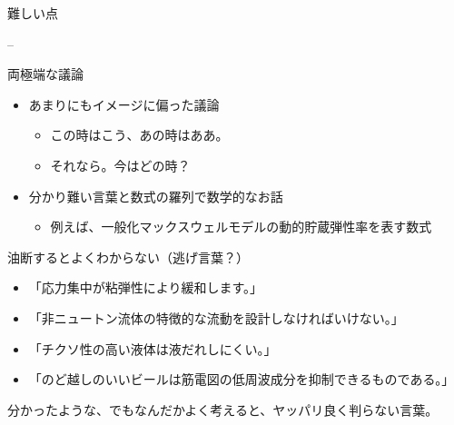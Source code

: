 \begin{frame}

\begin{block}{難しい点}

--

\begin{block}{両極端な議論}

\begin{itemize}
\tightlist
\item
  あまりにもイメージに偏った議論

  \begin{itemize}
  \tightlist
  \item
    この時はこう、あの時はああ。
  \item
    それなら。今はどの時？
  \end{itemize}
\item
  分かり難い言葉と数式の羅列で数学的なお話

  \begin{itemize}
  \tightlist
  \item
    例えば、一般化マックスウェルモデルの動的貯蔵弾性率を表す数式
  \end{itemize}
\end{itemize}

\end{block}

\end{block}

\end{frame}

\begin{frame}

\begin{block}{油断するとよくわからない（逃げ言葉？）}

\begin{itemize}
\tightlist
\item
  「応力集中が粘弾性により緩和します。」
\item
  「非ニュートン流体の特徴的な流動を設計しなければいけない。」
\item
  「チクソ性の高い液体は液だれしにくい。」
\item
  「のど越しのいいビールは筋電図の低周波成分を抑制できるものである。」
\end{itemize}

{分かったような、でもなんだかよく考えると、ヤッパリ良く判らない言葉。}

\end{block}

\end{frame}

